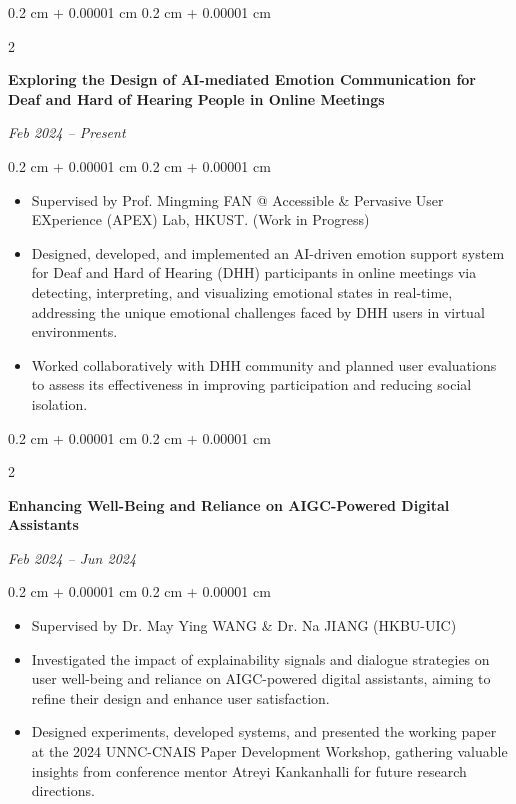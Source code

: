 \documentclass[10pt, letterpaper]{article}
\newenvironment{highlights}{
    \begin{itemize}[
        topsep=0.10 cm,
        parsep=0.10 cm,
        partopsep=0pt,
        itemsep=0pt,
        leftmargin=0.4 cm + 10pt
    ]
}{
    \end{itemize}
} %
\newenvironment{onecolentry}{
    \begin{adjustwidth}{
        0.2 cm + 0.00001 cm
    }{
        0.2 cm + 0.00001 cm
    }
}{
    \end{adjustwidth}
} %
\newenvironment{twocolentry}[2][]{
    \onecolentry
    \def\secondColumn{#2}
    \setcolumnwidth{\fill, 4.5 cm}
    \begin{paracol}{2}
}{
    \switchcolumn \raggedleft \secondColumn
    \end{paracol}
    \endonecolentry
} %
\begin{document}
        \vspace{0.2 cm}

        \begin{twocolentry}{
        \textit{Feb 2024 – Present}}
            \textbf{Exploring the Design of AI-mediated Emotion Communication for Deaf and Hard of Hearing People in Online Meetings}
        \end{twocolentry}

        \vspace{0.10 cm}
        \begin{onecolentry}
            \begin{highlights}
                \item Supervised by Prof. Mingming FAN @ Accessible \& Pervasive User EXperience (APEX) Lab, HKUST. (Work in Progress)
                \item Designed, developed, and implemented an AI-driven emotion support system for Deaf and Hard of Hearing (DHH) participants in online meetings via detecting, interpreting, and visualizing emotional states in real-time, addressing the unique emotional challenges faced by DHH users in virtual environments.
                \item Worked collaboratively with DHH community and planned user evaluations to assess its effectiveness in improving participation and reducing social isolation.
            \end{highlights}
        \end{onecolentry}

        \vspace{0.2 cm}

        \begin{twocolentry}{
        \textit{Feb 2024 – Jun 2024}}
            \textbf{Enhancing Well-Being and Reliance on AIGC-Powered Digital Assistants}
        \end{twocolentry}

        \vspace{0.10 cm}
        \begin{onecolentry}
            \begin{highlights}
                \item Supervised by Dr. May Ying WANG \& Dr. Na JIANG (HKBU-UIC)
                \item Investigated the impact of explainability signals and dialogue strategies on user well-being and reliance on AIGC-powered digital assistants, aiming to refine their design and enhance user satisfaction.
                \item Designed experiments, developed systems, and presented the working paper at the 2024 UNNC-CNAIS Paper Development Workshop, gathering valuable insights from conference mentor Atreyi Kankanhalli for future research directions.
            \end{highlights}
        \end{onecolentry}
\end{document}
